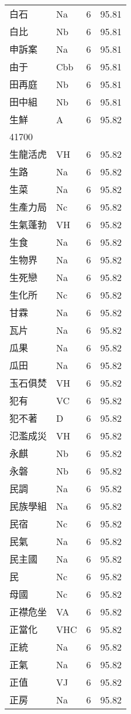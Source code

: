 \documentclass[twocolumn]{book}
\begin{document}
\begin{supertabular}{llrr}
白石 & Na & 6 &  95.81\\
白比 & Nb & 6 &  95.81\\
申訴案 & Na & 6 &  95.81\\
由于 & Cbb & 6 &  95.81\\
田再庭 & Nb & 6 &  95.81\\
田中組 & Nb & 6 &  95.81\\
生鮮 & A & 6 &  95.82\\
41700\\
生龍活虎 & VH & 6 &  95.82\\
生路 & Na & 6 &  95.82\\
生菜 & Na & 6 &  95.82\\
生產力局 & Nc & 6 &  95.82\\
生氣蓬勃 & VH & 6 &  95.82\\
生食 & Na & 6 &  95.82\\
生物界 & Na & 6 &  95.82\\
生死戀 & Na & 6 &  95.82\\
生化所 & Nc & 6 &  95.82\\
甘霖 & Na & 6 &  95.82\\
瓦片 & Na & 6 &  95.82\\
瓜果 & Na & 6 &  95.82\\
瓜田 & Na & 6 &  95.82\\
玉石俱焚 & VH & 6 &  95.82\\
犯有 & VC & 6 &  95.82\\
犯不著 & D & 6 &  95.82\\
氾濫成災 & VH & 6 &  95.82\\
永麒 & Nb & 6 &  95.82\\
永磐 & Nb & 6 &  95.82\\
民調 & Na & 6 &  95.82\\
民族學組 & Na & 6 &  95.82\\
民宿 & Nc & 6 &  95.82\\
民氣 & Na & 6 &  95.82\\
民主國 & Na & 6 &  95.82\\
民 & Nc & 6 &  95.82\\
母國 & Nc & 6 &  95.82\\
正襟危坐 & VA & 6 &  95.82\\
正當化 & VHC & 6 &  95.82\\
正統 & Na & 6 &  95.82\\
正氣 & Na & 6 &  95.82\\
正值 & VJ & 6 &  95.82\\
正房 & Na & 6 &  95.82\\

\end{supertabular}
\end{document}
